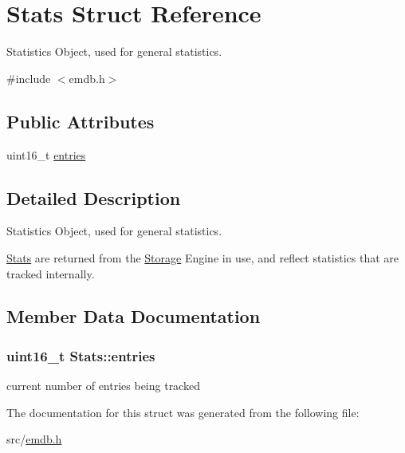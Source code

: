 \hypertarget{struct_stats}{}\section{Stats Struct Reference}
\label{struct_stats}


Statistics Object, used for general statistics.  




{\ttfamily \#include $<$emdb.\+h$>$}

\subsection*{Public Attributes}
\begin{DoxyCompactItemize}
\item 
uint16\+\_\+t \hyperlink{struct_stats_a0287a74f4140d399d2aa1db694c5c5db}{entries}
\end{DoxyCompactItemize}


\subsection{Detailed Description}
Statistics Object, used for general statistics. 

\hyperlink{struct_stats}{Stats} are returned from the \hyperlink{struct_storage}{Storage} Engine in use, and reflect statistics that are tracked internally. 

\subsection{Member Data Documentation}
\hypertarget{struct_stats_a0287a74f4140d399d2aa1db694c5c5db}{}
\subsubsection[{entries}]{\setlength{\rightskip}{0pt plus 5cm}uint16\+\_\+t Stats\+::entries}\label{struct_stats_a0287a74f4140d399d2aa1db694c5c5db}
current number of entries being tracked 

The documentation for this struct was generated from the following file\+:\begin{DoxyCompactItemize}
\item 
src/\hyperlink{emdb_8h}{emdb.\+h}\end{DoxyCompactItemize}
